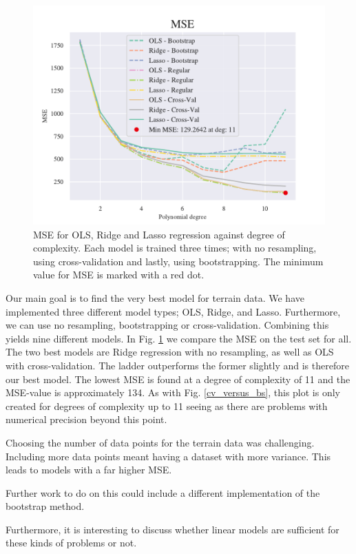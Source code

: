 \begin{figure}[h!]
    \centering
    \includegraphics[width=1\linewidth]{project_1/figures/figures_in_report/All_terrain.pdf}
    \caption{MSE for OLS, Ridge and Lasso regression against degree of complexity. Each model is trained three times; with no resampling, using cross-validation and lastly, using bootstrapping. The minimum value for MSE is marked with a red dot.}
    \label{all_terrain}
\end{figure}

Our main goal is to find the very best model for terrain data. We have implemented three different model types; OLS, Ridge, and Lasso. Furthermore, we can use no resampling, bootstrapping or cross-validation. Combining this yields nine different models. In Fig. \ref{all_terrain} we compare the MSE on the test set for all. The two best models are Ridge regression with no resampling, as well as OLS with cross-validation. The ladder outperforms the former slightly and is therefore our best model. The lowest MSE is found at a degree of complexity of 11 and the MSE-value is approximately 134. As with Fig. \ref{cv_versus_bs}, this plot is only created for degrees of complexity up to 11 seeing as there are problems with numerical precision beyond this point. 


Choosing the number of data points for the terrain data was challenging. Including more data points meant having a dataset with more variance. This leads to models with a far higher MSE. 

Further work to do on this could include a different implementation of the bootstrap method.

Furthermore, it is interesting to discuss whether linear models are sufficient for these kinds of problems or not. 

